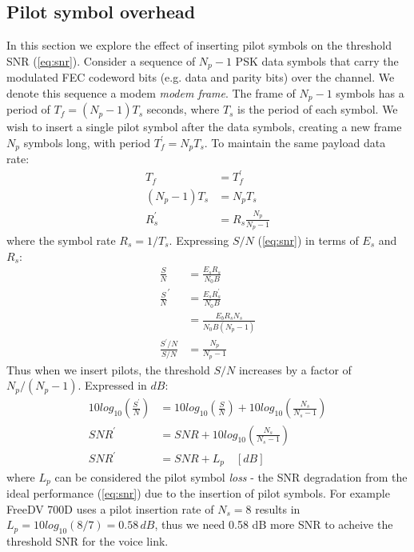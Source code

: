 \documentclass{article}
\begin{document}
\subsection{Pilot symbol overhead}

In this section we explore the effect of inserting pilot symbols on the threshold SNR (\ref{eq:snr}). Consider a sequence of $N_p-1$ PSK data symbols that carry the modulated FEC codeword bits (e.g. data and parity bits) over the channel. We denote this sequence a modem \emph{modem frame}. The frame of $N_p-1$ symbols has a period of $T_f=(N_p-1)T_s$ seconds, where $T_s$ is the period of each symbol.  We wish to insert a single pilot symbol after the data symbols, creating a new frame $N_p$ symbols long, with period $T^\prime_f=N_pT_s$.  To maintain the same payload data rate:
\begin{equation}
\begin{split}
T_f &= T^\prime_f \\
(N_p-1)T_s &= N_pT_s \\
R^\prime_s &= R_s\frac{N_p}{N_p-1}
\end{split}
\end{equation}
where the symbol rate $R_s=1/T_s$.  Expressing $S/N$ (\ref{eq:snr}) in terms of $E_s$ and $R_s$:
\begin{equation}
\label{eq_snr_s}
\begin{split}
\frac{S}{N} &= \frac{E_sR_s}{N_0B} \\
\frac{S}{N}^\prime &= \frac{E_sR^\prime_s}{N_0B} \\
                   &= \frac{E_bR_sN_s}{N_0B(N_p-1)} \\
\frac{S^\prime/N}{S/N} &= \frac{N_p}{N_p-1}
\end{split}
\end{equation}
Thus when we insert pilots, the threshold $S/N$ increases by a factor of $N_p/(N_p-1)$. Expressed in $\si{dB}$:
\begin{equation}
\begin{split}
10log_{10}\left(\frac{S^\prime}{N}\right) &= 10log_{10}\left(\frac{S}{N}\right) + 10log_{10}\left(\frac{N_s}{N_s-1}\right) \\
SNR^\prime &= SNR + 10log_{10}\left(\frac{N_s}{N_s-1}\right) \\
SNR^\prime &= SNR + L_p  \quad [\si{dB}]
\end{split}
\end{equation}
where $L_p$ can be considered the pilot symbol \emph{loss} - the SNR degradation from the ideal performance (\ref{eq:snr}) due to the insertion of pilot symbols. For example FreeDV 700D uses a pilot insertion rate of $N_s=8$ results in $L_p=10log_{10}(8/7)=0.58 \, \si{dB}$, thus we need 0.58 dB more SNR to acheive the threshold SNR for the voice link.
\end{document}
